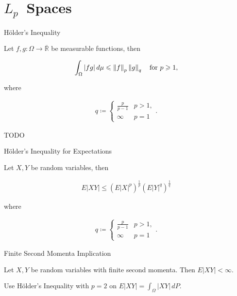 
\section{\texorpdfstring{$L_p$}\ \ Spaces}

\begin{theorem}{}{H\"older's Inequality}

    Let $f,g: \Omega \to \overline{\mathbb{R}}$ be measurable functions, then

        \begin{align*}
            \int_{\Omega} |fg| \, d\mu \leq \Norm{f}_p \Norm{g}_q \quad \textrm{for } p \geq 1,
        \end{align*}

    where

        \begin{align*}
            q \coloneqq 
            \begin{cases}
                \frac{p}{p - 1} & p > 1, \\
                \infty & p = 1
            \end{cases}.
        \end{align*}

    \Hint TODO

\end{theorem}

\begin{theorem}{}{H\"older's Inequality for Expectations}

    Let $X,Y$ be random variables, then

        \begin{align*}
            E|XY| \leq (E|X|^p)^{\frac{1}{p}} (E|Y|^q)^{\frac{1}{q}}
        \end{align*}

    where

        \begin{align*}
            q \coloneqq 
            \begin{cases}
                \frac{p}{p - 1} & p > 1, \\
                \infty & p = 1
            \end{cases}.
        \end{align*}

\end{theorem}

\begin{proposition}{}{Finite Second Momenta Implication}

    Let $X, Y$ be random variables with finite second momenta. Then $E|XY| < \infty$.

    \Hint Use H\"older's Inequality with $p = 2$ on $E|XY| = \int_{\Omega} |XY| \, dP$.

\end{proposition}


